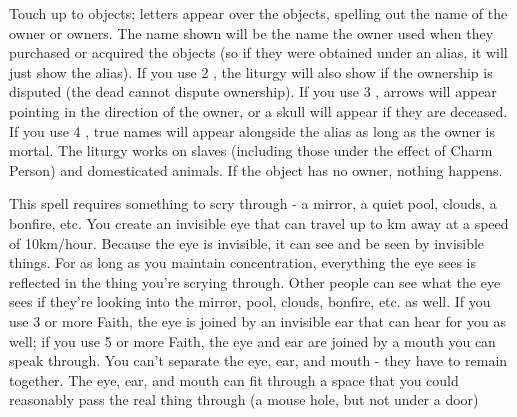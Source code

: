 {\LITURGY [
  Name= Reveal Ownership,
  Link=thoth-liturgy-reveal-ownership,
  Paradigm= Prophesy ,
  Save=  N ,
  Duration= \SUMDICE Minutes ,
  Counter=  n/a  ,
  Keywords= Splittable ,
  Target=   Close objects
]



Touch up to \DICE objects; letters appear over the objects, spelling out the name of the owner or owners.  The name shown will be the name the owner used when they purchased or acquired the objects (so if they were obtained under an alias, it will just show the alias). 
If you use 2 \DICE, the liturgy will also show if the ownership is disputed (the dead cannot dispute ownership).  If you use 3 \DICE, arrows will appear pointing in the direction of the owner, or a skull will appear if they are deceased.  If you use 4 \DICE, true names will appear alongside the alias as long as the owner is mortal.
The liturgy works on slaves (including those under the effect of Charm Person) and domesticated animals.  If the object has no owner, nothing happens.

\LITURGY [
  Name= Scry,
  Link=thoth-liturgy-scry,
  Paradigm= Prophesy ,
  Save=  N ,
  Duration= Concentration ,
  Counter=  n/a  ,
  Keywords= None ,
  Target=   Something up to \DICE km away
]



This spell requires something to scry through - a mirror, a quiet pool, clouds, a bonfire, etc.  You create an invisible eye that can travel up to \DICE km away at a speed of 10km/hour.  Because the eye is invisible, it can see and be seen by invisible things.  For as long as you maintain concentration, everything the eye sees is reflected in the thing you're scrying through.  Other people can see what the eye sees if they're looking into the mirror, pool, clouds, bonfire, etc.  as well. 
If you use 3 or more Faith, the eye is joined by an invisible ear that can hear for you as well; if you use 5 or more Faith, the eye and ear are joined by a mouth you can speak through.  You can't separate the eye, ear, and mouth - they have to remain together.  The eye, ear, and mouth can fit through a space that you could reasonably pass the real thing through (a mouse hole, but not under a door)


\newpage




}
